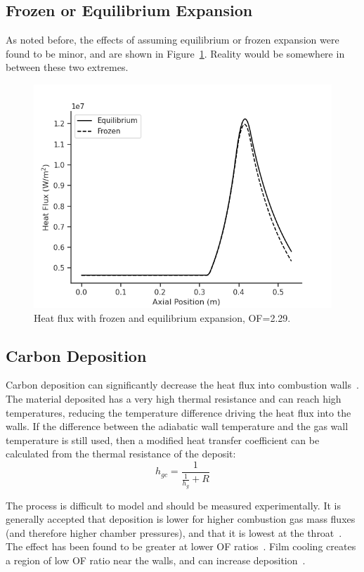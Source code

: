 \documentclass[11pt]{article}
\begin{document}
\subsection{Frozen or Equilibrium Expansion}
As noted before, the effects of assuming equilibrium or frozen expansion were found to be minor, and are shown in Figure~\ref{fig:equilibrium}. Reality would be somewhere in between these two extremes.

\begin{figure}[H]
  \centering
  \includegraphics[width=0.5\linewidth]{Equilibrium_Frozen.png}
  \caption{Heat flux with frozen and equilibrium expansion, OF=2.29.}
  \label{fig:equilibrium}
\end{figure}

\subsection{Carbon Deposition}
Carbon deposition can significantly decrease the heat flux into combustion walls~\cite[Page 86]{huang_modern_1992}. The material deposited has a very high thermal resistance and can reach high temperatures, reducing the temperature difference driving the heat flux into the walls. If the difference between the adiabatic wall temperature and the gas wall temperature is still used, then a modified heat transfer coefficient can be calculated from the thermal resistance of the deposit:
\begin{equation}
  h_{gc} = \frac{1}{\frac{1}{h_g} + R}
\end{equation}

The process is difficult to model and should be measured experimentally. It is generally accepted that deposition is lower for higher combustion gas mass fluxes (and therefore higher chamber pressures), and that it is lowest at the throat~\cite{huang_modern_1992, makel_carbon_1990}. The effect has been found to be greater at lower OF ratios~\cite{cook_advanced_1980}. Film cooling creates a region of low OF ratio near the walls, and can increase deposition~\cite[Page 35]{campbell_thrust_1963}.
\end{document}
